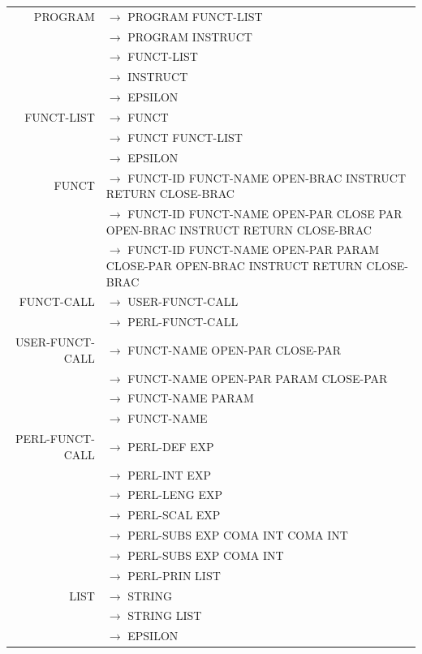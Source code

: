 \documentclass[a4paper,10pt]{article}
\begin{document}
\hspace{-4.5cm}\begin{tabular}{rl}
PROGRAM				& $\rightarrow$ PROGRAM FUNCT-LIST\\
					& $\rightarrow$ PROGRAM INSTRUCT\\
					& $\rightarrow$ FUNCT-LIST\\
					& $\rightarrow$ INSTRUCT\\
					& $\rightarrow$ EPSILON\\
					
					
FUNCT-LIST			& $\rightarrow$ FUNCT \\
					& $\rightarrow$ FUNCT FUNCT-LIST\\
					& $\rightarrow$ EPSILON\\
					
FUNCT				& $\rightarrow$ FUNCT-ID FUNCT-NAME OPEN-BRAC INSTRUCT RETURN CLOSE-BRAC \\
					& $\rightarrow$ FUNCT-ID FUNCT-NAME OPEN-PAR CLOSE PAR OPEN-BRAC INSTRUCT RETURN CLOSE-BRAC \\
					& $\rightarrow$ FUNCT-ID FUNCT-NAME OPEN-PAR PARAM CLOSE-PAR OPEN-BRAC INSTRUCT RETURN CLOSE-BRAC \\

FUNCT-CALL			& $\rightarrow$ USER-FUNCT-CALL \\
					& $\rightarrow$ PERL-FUNCT-CALL \\

USER-FUNCT-CALL		& $\rightarrow$ FUNCT-NAME OPEN-PAR CLOSE-PAR\\ 
					& $\rightarrow$ FUNCT-NAME OPEN-PAR PARAM CLOSE-PAR\\ 
					& $\rightarrow$ FUNCT-NAME PARAM\\ 
					& $\rightarrow$ FUNCT-NAME\\ 

				
PERL-FUNCT-CALL		& $\rightarrow$ PERL-DEF EXP \\
					& $\rightarrow$ PERL-INT EXP \\
					& $\rightarrow$ PERL-LENG EXP \\ 
					& $\rightarrow$ PERL-SCAL EXP \\
					& $\rightarrow$ PERL-SUBS EXP COMA INT COMA INT \\
					& $\rightarrow$ PERL-SUBS EXP COMA INT  \\
					& $\rightarrow$ PERL-PRIN LIST \\ 
					
LIST				& $\rightarrow$ STRING \\
					& $\rightarrow$ STRING LIST\\
					& $\rightarrow$ EPSILON\\
				


\end{tabular}
\end{document}

